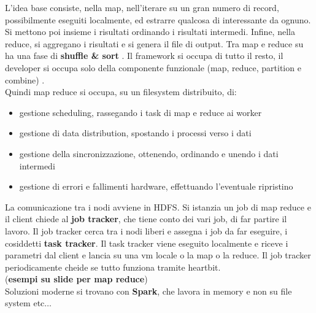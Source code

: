 \documentclass[a4paper,12pt, oneside]{book}
\begin{document}
L'idea base consiste, nella map, nell'iterare su un gran numero di record,
possibilmente 
eseguiti localmente, ed estrarre qualcosa di interessante da ognuno. Si mettono
poi insieme i risultati ordinando i risultati intermedi. Infine, nella reduce,
si aggregano i 
risultati e si genera il file di output. Tra map e reduce su ha una fase di
\textbf{shuffle \& sort} . Il framework si occupa di tutto il
resto, il developer si occupa solo della componente funzionale (map, reduce,
partition e combine) .\\
Quindi map reduce si occupa, su un filesystem distribuito, di:
\begin{itemize}
  \item gestione scheduling, rassegando i task di map e reduce ai worker
  \item gestione di data distribution, spostando i processi verso i dati
  \item gestione della sincronizzazione, ottenendo, ordinando e unendo i dati
  intermedi
  \item gestione di errori e fallimenti hardware, effettuando l'eventuale
  ripristino 
\end{itemize}
La comunicazione tra i nodi avviene in HDFS. Si istanzia un job di map reduce e
il client chiede al \textbf{job tracker}, che tiene conto dei vari job, di far
partire il lavoro. Il job tracker cerca tra i nodi liberi e assegna i job da far
eseguire, i cosiddetti \textbf{task tracker}. Il task tracker viene eseguito
localmente e riceve i parametri dal client e lancia su una vm locale o la map o
la reduce. Il job tracker periodicamente cheide se tutto funziona tramite
heartbit. \\
(\textbf{esempi su slide per map reduce})\\
Soluzioni moderne si trovano con \textbf{Spark}, che lavora in memory e non su
file system etc$\ldots$
\end{document}
